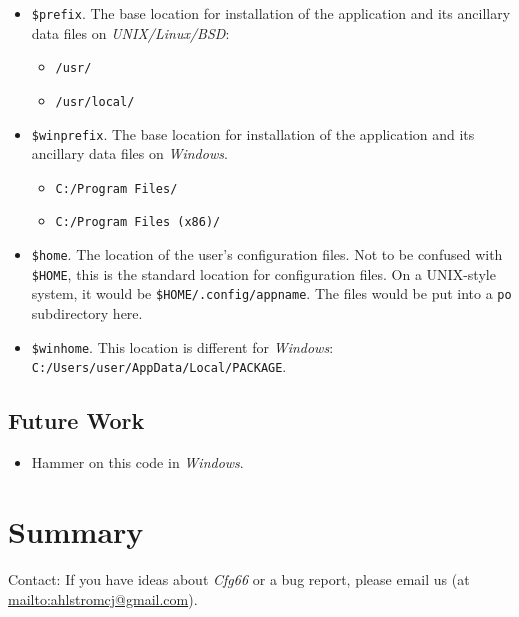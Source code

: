 \documentclass[
 11pt,
 twoside,
 a4paper,
 final                                 %
]{article}
\begin{document}
   \begin{itemize}
      \item \texttt{\$prefix}. The base location for installation of
         the application and its ancillary data files on
         \textsl{UNIX/Linux/BSD}:
         \begin{itemize}
            \item \texttt{/usr/}
            \item \texttt{/usr/local/}
         \end{itemize}
      \item \texttt{\$winprefix}. The base location for installation of
         the application and its ancillary data files on \textsl{Windows}.
         \begin{itemize}
            \item \texttt{C:/Program Files/}
            \item \texttt{C:/Program Files (x86)/}
         \end{itemize}
      \item \texttt{\$home}. The location of the user's configuration files.
         Not to be confused with \texttt{\$HOME}, this is
         the standard location for configuration files.
         On a UNIX-style system, it would be \linebreak
         \texttt{\$HOME/.config/appname}.
         The files would be put into a \texttt{po} subdirectory here.
      \item \texttt{\$winhome}. This location is different for
         \textsl{Windows}:
         \texttt{C:/Users/user/AppData/Local/PACKAGE}.
   \end{itemize}

\subsection{Future Work}
\label{subsec:introduction_future}

   \begin{itemize}
      \item Hammer on this code in \textsl{Windows}.
   \end{itemize}








\section{Summary}
\label{sec:summary}

   Contact: If you have ideas about \textsl{Cfg66} or a bug report,
   please email us (at \url{mailto:ahlstromcj@gmail.com}).




\printindex
\end{document}
